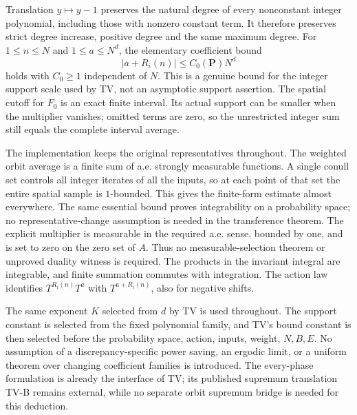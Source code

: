 Translation $y\mapsto y-1$ preserves the natural degree of every nonconstant
integer polynomial, including those with nonzero constant term. It therefore
preserves strict degree increase, positive degree and the same maximum degree.
For $1\leq n\leq N$ and $1\leq a\leq N^d$, the elementary coefficient bound
\[
 |a+R_i(n)|\leq C_0(\mathbf P)N^d
\]
holds with $C_0\geq1$ independent of $N$. This is a genuine bound for the
integer support scale used by TV, not an asymptotic support assertion. The
spatial cutoff for $F_0$ is an exact finite interval. Its actual support can
be smaller when the multiplier vanishes; omitted terms are zero, so the
unrestricted integer sum still equals the complete interval average.

The implementation keeps the original representatives throughout. The
weighted orbit average is a finite sum of a.e. strongly measurable functions.
A single conull set controls all integer iterates of all the inputs, so at
each point of that set the entire spatial sample is $1$-bounded. This gives
the finite-form estimate almost everywhere. The same essential bound proves
integrability on a probability space; no representative-change assumption is
needed in the transference theorem. The
explicit multiplier is measurable in the required a.e. sense, bounded by one,
and is set to zero on the zero set of $A$. Thus no measurable-selection theorem
or unproved duality witness is required. The products in the invariant integral
are integrable, and finite summation commutes with integration. The action law
identifies $T^{R_i(n)}T^a$ with $T^{a+R_i(n)}$, also for negative shifts.

The same exponent $K$ selected from $d$ by TV is used throughout. The support
constant is selected from the fixed polynomial family, and TV's bound constant
is then selected before the probability space, action, inputs, weight,
$N,B,E$. No assumption of a discrepancy-specific power saving, an ergodic
limit, or a uniform theorem over changing coefficient families is introduced.
The every-phase formulation is already the interface of TV; its published
supremum translation TV-B remains external, while no separate orbit supremum
bridge is needed for this deduction.
\fi
